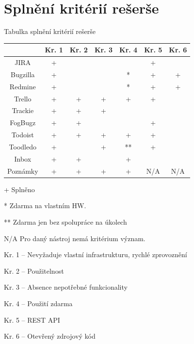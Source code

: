 \documentclass[thesis=B,czech]{FITthesis}[2012/06/26]
\newcommand{\crita}{Nevyžaduje vlastní infrastrukturu, rychlé zprovoznění}
\newcommand{\critb}{Použitelnost}
\newcommand{\critc}{Absence nepotřebné funkcionality}
\newcommand{\critd}{Použití zdarma}
\newcommand{\critf}{REST API}
\newcommand{\critg}{Otevřený zdrojový kód}
\begin{document}
\chapter{Splnění kritérií rešerše}
	\begin{center}
	\begin{threeparttable}
		\caption{Tabulka splnění kritérií rešerše}
		\label{table:criteria}
		\begin{tabular}{|c||c|c|c|c|c|c|}
			\hline
			           & Kr. 1 & Kr. 2 & Kr. 3 & Kr. 4 & Kr. 5 & Kr. 6 \\ \hline
			JIRA       & +     & ~     & ~     & ~     & +     & ~     \\ \hline
			Bugzilla   & +     & ~     & ~     & *     & +     & +     \\ \hline
			Redmine    & +     & ~     & ~     & *     & +     & +     \\ \hline
			Trello     & +     & +     & +     & +     & +     & ~     \\ \hline
			Trackie    & +     & +     & +     & ~     & ~     & ~     \\ \hline
			FogBugz    & +     & +     & ~     & ~     & +     & ~     \\ \hline
			Todoist    & +     & +     & +     & +     & +     & ~     \\ \hline
			Toodledo   & +     & ~     & +     & **    & +     & ~     \\ \hline
			Inbox      & +     & +     & ~     & +     & ~     & ~     \\ \hline
			Poznámky   & +     & +     & +     & +     & N/A   & N/A   \\ \hline
			
		\end{tabular}
		
		\begin{tablenotes}
			\item[+] Splněno
			\item[*] Zdarma na vlastním HW.
			\item[**] Zdarma jen bez spolupráce na úkolech
			\item[N/A] Pro daný nástroj nemá kritérium význam.
			\item Kr. 1 -- \crita
			\item Kr. 2 -- \critb
			\item Kr. 3 -- \critc
			\item Kr. 4 -- \critd
			\item Kr. 5 -- \critf
			\item Kr. 6 -- \critg
		\end{tablenotes}
		
	\end{threeparttable}
	\end{center}
\end{document}
